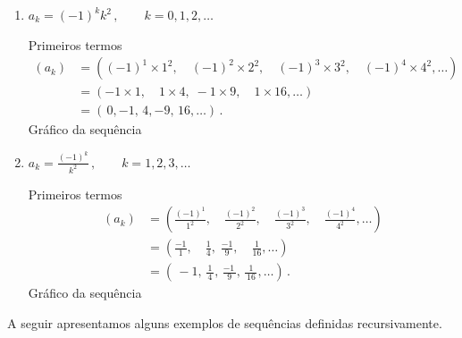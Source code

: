 \begin{example}
\begin{enumerate}
  \item \( a_k = (-1)^k k^2 \,, \qquad k = 0, 1, 2, \dots \) \par
    Primeiros termos
    \begin{align*}
      (a_k)
        & = \left( (-1)^1 \times 1^2, \quad
                   (-1)^2 \times 2^2, \quad
                   (-1)^3 \times 3^2, \quad
                   (-1)^4 \times 4^2, \dots \right) \\
        & = \left( -1 \times 1,  \quad
                    1 \times 4,  \;
                   -1 \times 9,  \quad
                    1 \times 16, \dots \right) \\
        & = \left(\, 0, -1, \, 4, -9, \, 16, \dots \right) \,.
    \end{align*}
    Gráfico da sequência
    \begin{flushleft}
      
    \end{flushleft}

  \item \( a_k = \frac{(-1)^k}{k^2} \,, \qquad k = 1, 2, 3, \dots \) \par
    Primeiros termos
    \begin{align*}
      (a_k)
        & = \left( \frac{(-1)^1}{1^2}, \quad
                   \frac{(-1)^2}{2^2}, \quad
                   \frac{(-1)^3}{3^2}, \quad
                   \frac{(-1)^4}{4^2}, \dots \right) \\
        & = \left( \frac{-1}{1},  \quad
                   \frac{ 1}{4},  \;
                   \frac{-1}{9},  \quad
                   \frac{ 1}{16}, \dots \right) \\
        & = \left(\, -1, \,
                  \frac{1}{\,4\,},  \,
                  \frac{-1\,}{9},   \,
                  \frac{1}{\,16\,}, \dots \right)  \,.
    \end{align*}
    Gráfico da sequência
    \begin{flushleft}
      
    \end{flushleft}
\end{enumerate}
\end{example}

A seguir apresentamos alguns exemplos de sequências definidas recursivamente.

